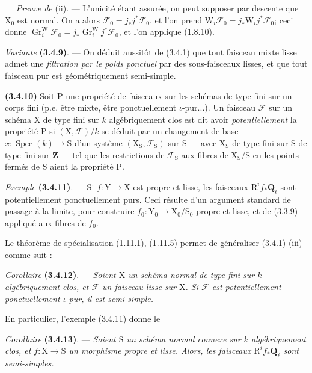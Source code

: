 \documentclass[11pt,leqno]{article}
\newcommand{\Page}[1]{\ifvmode\noindent\else\unskip\ \fi{\footnotesize\textcolor{gray}{[p.\,#1]}}\ \ignorespaces}
\begin{document}
\Page{210}
\textit{Preuve de} (ii). — L’unicité étant assurée, on peut supposer par descente que \(\mathrm X_0\) est normal. On a alors \(\mathscr F_0=j_*j^*\mathscr F_0\), et l’on prend \(\mathrm W_i\mathscr F_0=j_*\mathrm W_i j^*\mathscr F_0\); ceci donne \(\operatorname{Gr}_i^{\mathrm W}\mathscr F_0=j_*\operatorname{Gr}_i^{\mathrm W}j^*\mathscr F_0\), et l’on applique (1.8.10).

\textit{Variante} \textbf{(3.4.9)}. — On déduit aussitôt de (3.4.1) que tout faisceau mixte lisse admet une \textit{filtration par le poids ponctuel} par des sous-faisceaux lisses, et que tout faisceau pur est géométriquement semi-simple.

\textbf{(3.4.10)} Soit \(\mathrm P\) une propriété de faisceaux sur les schémas de type fini sur un corps fini (p.e. être mixte, être ponctuellement \(\iota\)-pur...). Un faisceau \(\mathscr F\) sur un schéma \(\mathrm X\) de type fini sur \(k\) algébriquement clos est dit avoir \textit{potentiellement} la propriété \(\mathrm P\) si \((\mathrm X,\mathscr F)/k\) se déduit par un changement de base \(\bar x:\operatorname{Spec}(k)\to\mathrm S\) d’un système \((\mathrm X_{\mathrm S},\mathscr F_{\mathrm S})\) sur \(\mathrm S\) — avec \(\mathrm X_{\mathrm S}\) de type fini sur \(\mathrm S\) de type fini sur \(\mathbf Z\) — tel que les restrictions de \(\mathscr F_{\mathrm S}\) aux fibres de \(\mathrm X_{\mathrm S}/\mathrm S\) en les points fermés de \(\mathrm S\) aient la propriété \(\mathrm P\).

\textit{Exemple} \textbf{(3.4.11)}. — Si \(f:\mathrm Y\to\mathrm X\) est propre et lisse, les faisceaux \(\mathrm R^if_*\mathbf Q_\ell\) sont potentiellement ponctuellement purs. Ceci résulte d’un argument standard de passage à la limite, pour construire \(f_0:\mathrm Y_0\to\mathrm X_0/\mathrm S_0\) propre et lisse, et de (3.3.9) appliqué aux fibres de \(f_0\).

Le théorème de spécialisation (1.11.1), (1.11.5) permet de généraliser (3.4.1) (iii) comme suit :

\textit{Corollaire} \textbf{(3.4.12)}. — \textit{Soient \(\mathrm X\) un schéma normal de type fini sur \(k\) algébriquement clos, et \(\mathscr F\) un faisceau lisse sur \(\mathrm X\). Si \(\mathscr F\) est potentiellement ponctuellement \(\iota\)-pur, il est semi-simple.}

En particulier, l’exemple (3.4.11) donne le

\textit{Corollaire} \textbf{(3.4.13)}. — \textit{Soient \(\mathrm S\) un schéma normal connexe sur \(k\) algébriquement clos, et \(f:\mathrm X\to\mathrm S\) un morphisme propre et lisse. Alors, les faisceaux \(\mathrm R^if_*\mathbf Q_\ell\) sont semi-simples.}
\end{document}
